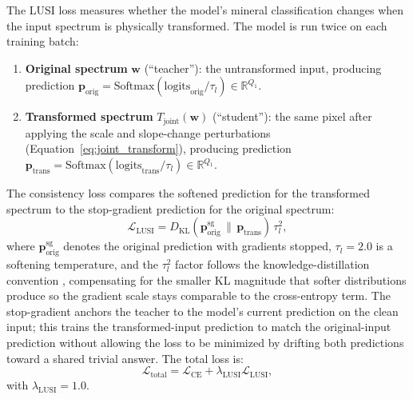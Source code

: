 \documentclass[preprint,12pt]{elsarticle}
\newcommand{\R}{\mathbb{R}}
\begin{document}
The LUSI loss measures whether the model's mineral classification changes when the input spectrum is physically transformed. The model is run twice on each training batch:
\begin{enumerate}
  \item \textbf{Original spectrum} $\mathbf{w}$ (``teacher''): the untransformed input, producing prediction $\mathbf{p}_{\text{orig}} = \text{Softmax}(\text{logits}_{\text{orig}} / \tau_l) \in \R^{Q_1}$.
  \item \textbf{Transformed spectrum} $T_{\text{joint}}(\mathbf{w})$ (``student''): the same pixel after applying the scale and slope-change perturbations (Equation~\ref{eq:joint_transform}), producing prediction $\mathbf{p}_{\text{trans}} = \text{Softmax}(\text{logits}_{\text{trans}} / \tau_l) \in \R^{Q_1}$.
\end{enumerate}
The consistency loss compares the softened prediction for the transformed spectrum to the stop-gradient prediction for the original spectrum:
\begin{equation}
\mathcal{L}_{\text{LUSI}} =
D_{\text{KL}}\!\left(
\mathbf{p}_{\text{orig}}^{\mathrm{sg}}
\,\|\,
\mathbf{p}_{\text{trans}}
\right)\,\tau_l^{2},
\label{eq:lusi_kl}
\end{equation}
where $\mathbf{p}_{\text{orig}}^{\mathrm{sg}}$ denotes the original prediction with gradients stopped, $\tau_l = 2.0$ is a softening temperature, and the $\tau_l^{2}$ factor follows the knowledge-distillation convention \cite{hinton2015distilling}, compensating for the smaller KL magnitude that softer distributions produce so the gradient scale stays comparable to the cross-entropy term. The stop-gradient anchors the teacher to the model's current prediction on the clean input; this trains the transformed-input prediction to match the original-input prediction without allowing the loss to be minimized by drifting both predictions toward a shared trivial answer. The total loss is:
\begin{equation}
\mathcal{L}_{\text{total}} = \mathcal{L}_{\text{CE}} + \lambda_{\text{LUSI}} \mathcal{L}_{\text{LUSI}},
\label{eq:lusi_total}
\end{equation}
with $\lambda_{\text{LUSI}} = 1.0$.
\end{document}
